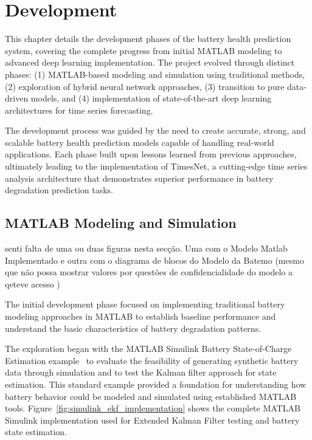 \chapter{Development}
\label{ch:Development}



This chapter details the development phases of the battery health prediction system, covering the complete progress from initial MATLAB modeling to advanced deep learning implementation. The project evolved through distinct phases: (1) MATLAB-based modeling and simulation using traditional methods, (2) exploration of hybrid neural network approaches, (3) transition to pure data-driven models, and (4) implementation of state-of-the-art deep learning architectures for time series forecasting.

The development process was guided by the need to create accurate, strong, and scalable battery health prediction models capable of handling real-world applications. Each phase built upon lessons learned from previous approaches, ultimately leading to the implementation of TimesNet, a cutting-edge time series analysis architecture that demonstrates superior performance in battery degradation prediction tasks.

\section{MATLAB Modeling and Simulation}
\label{sec:matlab_modeling}

\color{Red}senti falta de uma ou duas figuras nesta secção. Uma com o Modelo Matlab Implementado e outra com o diagrama de blocos do Modelo da Batemo (mesmo que não possa mostrar valores por questões de confidencialidade do modelo a qeteve acesso ) \color{Black}

The initial development phase focused on implementing traditional battery modeling approaches in MATLAB to establish baseline performance and understand the basic characteristics of battery degradation patterns.

The exploration began with the MATLAB Simulink Battery State-of-Charge Estimation example~\cite{mathworks_battery_soc_2024} to evaluate the feasibility of generating synthetic battery data through simulation and to test the Kalman filter approach for state estimation. This standard example provided a foundation for understanding how battery behavior could be modeled and simulated using established MATLAB tools. Figure~\ref{fig:simulink_ekf_implementation} shows the complete MATLAB Simulink implementation used for Extended Kalman Filter testing and battery state estimation.

